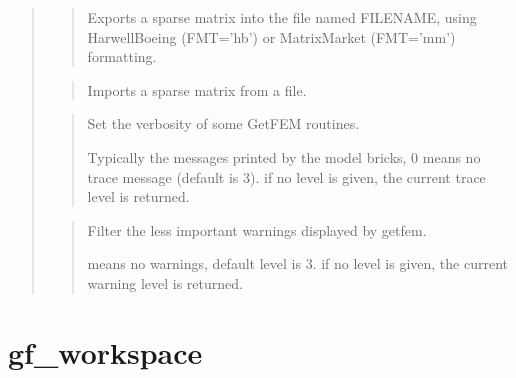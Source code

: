 \documentclass[a4paper,11pt,english]{sphinxmanual}
\begin{document}
\sphinxAtStartPar
{}
\begin{quote}

\sphinxAtStartPar
{}
\begin{quote}

\sphinxAtStartPar
Exports a sparse matrix into the file named FILENAME, using
Harwell\sphinxhyphen{}Boeing (FMT=’hb’) or Matrix\sphinxhyphen{}Market (FMT=’mm’) formatting.
\end{quote}

\sphinxAtStartPar
{}
\begin{quote}

\sphinxAtStartPar
Imports a sparse matrix from a file.
\end{quote}

\sphinxAtStartPar
{}
\begin{quote}

\sphinxAtStartPar
Set the verbosity of some GetFEM routines.

\sphinxAtStartPar
Typically the messages printed by the model bricks, 0 means no
trace message (default is 3). if no level is given,
the current trace level is returned.
\end{quote}

\sphinxAtStartPar
{}
\begin{quote}

\sphinxAtStartPar
Filter the less important warnings displayed by getfem.

 means no warnings, default level is 3. if no level is given,
the current warning level is returned.
\end{quote}
\end{quote}


\section{gf\_workspace}
\label{\detokenize{matlab_octave/cmdref_gf_workspace:gf-workspace}}\label{\detokenize{matlab_octave/cmdref_gf_workspace::doc}}
\sphinxAtStartPar
{}
\end{document}
